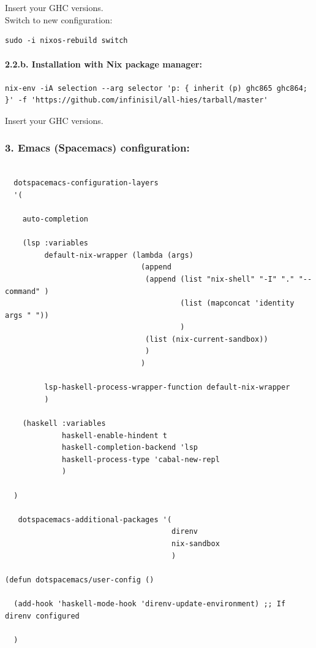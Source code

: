 \documentclass[11pt]{article}
\begin{document}
Insert your GHC versions.\\

Switch to new configuration:\\

\begin{verbatim}
sudo -i nixos-rebuild switch
\end{verbatim}

\paragraph{2.2.b. Installation with Nix package manager:}
\label{sec:org2d6ac0f}

\begin{verbatim}
nix-env -iA selection --arg selector 'p: { inherit (p) ghc865 ghc864; }' -f 'https://github.com/infinisil/all-hies/tarball/master'
\end{verbatim}

Insert your GHC versions.\\

\subsubsection{3. Emacs (Spacemacs) configuration:}
\label{sec:org6d39470}

\begin{verbatim}

  dotspacemacs-configuration-layers
  '(

    auto-completion

    (lsp :variables
         default-nix-wrapper (lambda (args)
                               (append
                                (append (list "nix-shell" "-I" "." "--command" )
                                        (list (mapconcat 'identity args " "))
                                        )
                                (list (nix-current-sandbox))
                                )
                               )

         lsp-haskell-process-wrapper-function default-nix-wrapper
         )

    (haskell :variables
             haskell-enable-hindent t
             haskell-completion-backend 'lsp
             haskell-process-type 'cabal-new-repl
             )

  )

   dotspacemacs-additional-packages '(
                                      direnv
                                      nix-sandbox
                                      )

(defun dotspacemacs/user-config ()

  (add-hook 'haskell-mode-hook 'direnv-update-environment) ;; If direnv configured

  )
\end{verbatim}
\end{document}
